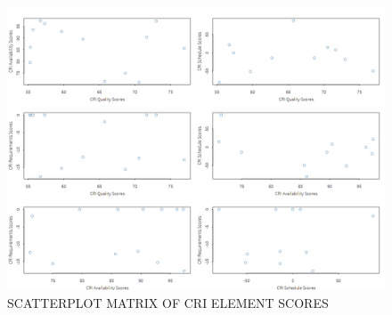 \documentclass[SDSUThesis.tex]{subfiles}
\begin{document}
        
        \begin{figure}[htb]
            \centering
            \includegraphics[scale=.3]{images/correlation.png}
            \caption{SCATTERPLOT MATRIX OF CRI ELEMENT SCORES}
            \label{fig:correlation_cri}
        \end{figure}
        
\end{document}
